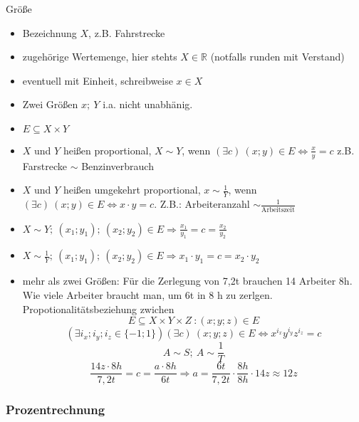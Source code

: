 Größe
\begin{itemize}
    \item Bezeichnung $X$, z.B. Fahrstrecke
    \item zugehörige Wertemenge, hier stehts $X\in \mathbb{R}$ (notfalls runden mit Verstand)
    \item eventuell mit Einheit, schreibweise $x \in X$
    \item Zwei Größen $x;\ Y$ i.a. nicht unabhänig.
    \item $E \subseteq X \times Y$
    \item $X$ und $Y$ heißen proportional, $X \sim Y$, wenn $(\exists c)\ (x;y) \in E \Leftrightarrow \frac{x}{y}=c$ z.B. Farstrecke $\sim$ Benzinverbrauch
    \item $X$ und $Y$ heißen umgekehrt proportional, $x \sim \frac{1}{Y}$, wenn $(\exists c)\ (x;y) \in E \Leftrightarrow x \cdot y = c$. Z.B.: Arbeiteranzahl $\sim \frac{1}{\textrm{Arbeitszeit}}$
    \item $X \sim Y;\ (x_1;y_1);\ (x_2;y_2) \in E \Rightarrow \frac{x_1}{y_1} = c = \frac{x_2}{y_2}$
    \item $X \sim \frac{1}{Y};\ (x_1;y_1);\ (x_2;y_2) \in E \Rightarrow x_1 \cdot y_1 = c = x_2 \cdot y_2$
    \item mehr als zwei Größen: Für die Zerlegung von 7,2t brauchen 14 Arbeiter 8h. Wie viele Arbeiter braucht man, um 6t in 8 h zu zerlgen. \\
    Propotionalitätsbeziehung zwichen \[E \subseteq X \times  Y \times Z\ : (x; y; z) \in E\] \[(\exists i_x; i_y; i_z \in \lbrace -1; 1 \rbrace) (\exists c)\ (x;y;z) \in E \Leftrightarrow x^{i_x}y^{i_y}z^{i_z} = c\]
    \[A \sim S;\ A \sim \frac{1}{T}\]
    \[\frac{14z \cdot 8h}{7{,}2t}=c=\frac{a \cdot 8h}{6t} \Rightarrow a = \frac{6t}{7{,}2t}\cdot \frac{8h}{8h} \cdot 14z \approx 12z\]
\end{itemize}

\subsubsection{Prozentrechnung}

